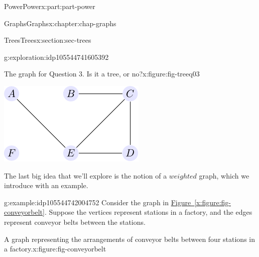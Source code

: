 \documentclass[oneside,10pt,]{book}
\newcommand{\xreffont}{\relax}
\numberwithin{equation}{section}
\begin{document}
\begin{partptx}{Power}{}{Power}{}{}{x:part:part-power}
\begin{chapterptx}{Graphs}{}{Graphs}{}{}{x:chapter:chap-graphs}
\begin{sectionptx}{Trees}{}{Trees}{}{}{x:section:sec-trees}
\begin{exploration}{}{g:exploration:idp105544741605392}
\begin{enumerate}
\begin{figureptx}{The graph for Question 3. Is it a tree, or no?}{x:figure:fig-treeq03}{}
\begin{image}{0.25}{0.5}{0.25}
\includegraphics[width=\linewidth]{images/tree03.pdf}
\end{image}%
\tcblower
\end{figureptx}%
%
\end{enumerate}
\end{exploration}%
The last big idea that we'll explore is the notion of a \(weighted\) graph, which we introduce with an example.%
\begin{example}{}{g:example:idp105544742004752}%
Consider the graph in \hyperref[x:figure:fig-conveyorbelt]{Figure~{\xreffont\ref{x:figure:fig-conveyorbelt}}}. Suppose the vertices represent stations in a factory, and the edges represent conveyor belts between the stations.%
\begin{figureptx}{A graph representing the arrangements of conveyor belts between four stations in a factory.}{x:figure:fig-conveyorbelt}{}%
\begin{image}{0.25}{0.5}{0.25}%

\end{image}
\end{figureptx}
\end{example}
\end{sectionptx}
\end{chapterptx}
\end{partptx}
\end{document}
